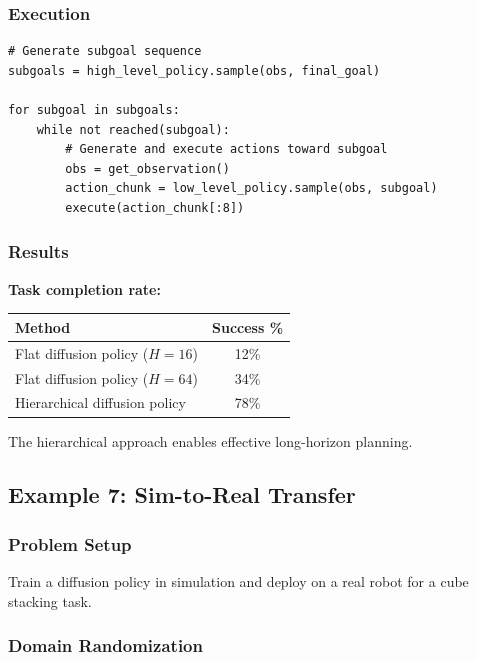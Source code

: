 \subsubsection{Execution}

\begin{verbatim}
# Generate subgoal sequence
subgoals = high_level_policy.sample(obs, final_goal)

for subgoal in subgoals:
    while not reached(subgoal):
        # Generate and execute actions toward subgoal
        obs = get_observation()
        action_chunk = low_level_policy.sample(obs, subgoal)
        execute(action_chunk[:8])
\end{verbatim}

\subsubsection{Results}

\textbf{Task completion rate:}
\begin{center}
\begin{tabular}{lc}
\toprule
\textbf{Method} & \textbf{Success \%} \\
\midrule
Flat diffusion policy ($H = 16$) & 12\% \\
Flat diffusion policy ($H = 64$) & 34\% \\
Hierarchical diffusion policy & 78\% \\
\bottomrule
\end{tabular}
\end{center}

The hierarchical approach enables effective long-horizon planning.

\subsection{Example 7: Sim-to-Real Transfer}
\label{subsec:example_sim_to_real}

\subsubsection{Problem Setup}

Train a diffusion policy in simulation and deploy on a real robot for a cube stacking task.

\subsubsection{Domain Randomization}


